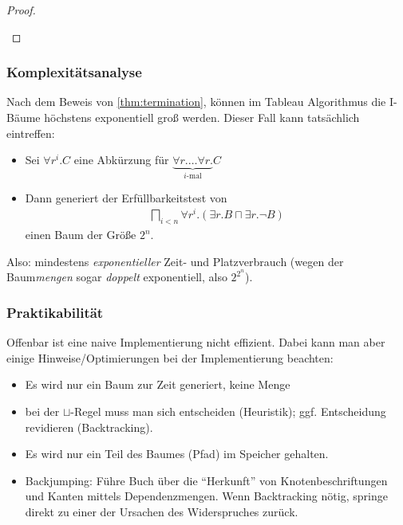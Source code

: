\begin{proof}
\begin{tafel}
\begin{itemize}
\end{itemize}

\end{tafel}


\end{proof}

\subsubsection{Komplexitätsanalyse}\label{praktikabilituxe4t}

Nach dem Beweis von \autoref{thm:termination}, können im Tableau Algorithmus die I-Bäume höchstens exponentiell groß werden. Dieser Fall kann tatsächlich eintreffen:
\begin{itemize}
    \item Sei $\forall r^i.C$ eine Abkürzung für $\underbrace{\forall r.\ldots \forall r.}_{i\text{-mal}}C$
    \item Dann generiert der Erfüllbarkeitstest von
        \begin{align*}
            \bigsqcap_{i < n} \forall r^i.(\exists r.B \sqcap \exists r.\neg B)
        \end{align*}
        einen Baum der Größe $2^n$.
\end{itemize}
\begin{tafel}[TODO]

\end{tafel}

Also: mindestens \emph{exponentieller} Zeit- und Platzverbrauch (wegen der Baum\emph{mengen} sogar \emph{doppelt} exponentiell, also $2^{2^n}$).

\subsubsection{Praktikabilität}

Offenbar ist eine naive Implementierung nicht effizient. Dabei kann man aber einige Hinweise/Optimierungen bei der Implementierung beachten:

\begin{itemize}
	\item Es wird nur ein Baum zur Zeit generiert, keine Menge
	\item bei der $\sqcup$-Regel muss man sich entscheiden (Heuristik); ggf. Entscheidung revidieren (Backtracking).
	\item Es wird nur ein Teil des Baumes (Pfad) im Speicher gehalten.
    \item Backjumping: Führe Buch über die \enquote{Herkunft} von Knotenbeschriftungen und Kanten mittels Dependenzmengen. Wenn Backtracking nötig, springe direkt zu einer der Ursachen des Widerspruches zurück.
\end{itemize}

